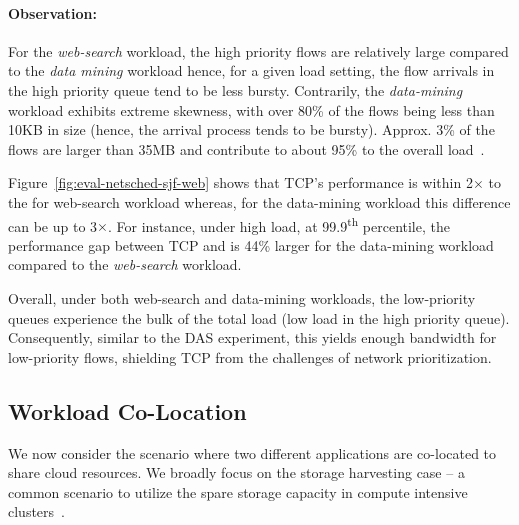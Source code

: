\paragraph{Observation:} For the \emph{web-search} workload, the high priority flows are relatively large compared to the \emph{data mining} workload hence, for a given load setting, the flow arrivals in the high priority queue tend to be less bursty.
Contrarily, the \emph{data-mining} workload exhibits extreme skewness, with over 80\% of the flows being less than 10KB in size (hence, the arrival process tends to be bursty). Approx. 3\% of the flows are larger than 35MB and contribute to about 95\% to the overall load~\cite{pfabric}. 

Figure~\ref{fig:eval-netsched-sjf-web} shows that TCP's performance is within 2$\times$ to the \nearopt{} for web-search workload whereas, for the data-mining workload this difference can be up to 3$\times$. For instance, under high load, at 99.9\textsuperscript{th} percentile, the performance gap between TCP and \nearopt{} is 44\% larger for the data-mining workload compared to the \emph{web-search} workload. 

Overall, under both web-search and data-mining workloads, the low-priority queues experience the bulk of the total load (low load in the high priority queue).
Consequently, similar to the DAS experiment, this yields enough bandwidth for low-priority flows, shielding TCP from the challenges of network prioritization.


\subsection{\textbf{Workload Co-Location}}
\label{sec:eval-wl-col}

We now consider the scenario where two different applications are co-located to share cloud resources.
We broadly focus on the storage harvesting case -- a common scenario to utilize the spare storage capacity in compute intensive clusters~\cite{wl-col-ms-harvest}. 

